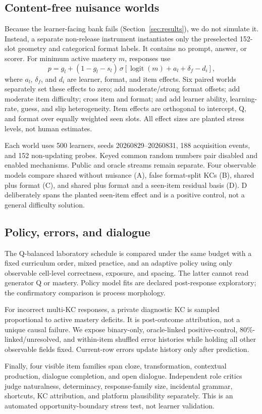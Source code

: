 \subsection{Content-free nuisance worlds}

Because the learner-facing bank fails (Section~\ref{sec:results}), we do not
simulate it.  Instead, a separate non-release instrument instantiates only the
preselected 152-slot geometry and categorical format labels.  It contains no
prompt, answer, or scorer.  For minimum active mastery $m$, responses use
\begin{equation}
p=g_l+(1-g_l-s_l)\,\sigma\!\left[
\operatorname{logit}(m)+a_l+\delta_f-d_i\right],
\end{equation}
where $a_l$, $\delta_f$, and $d_i$ are learner, format, and item effects.  Six
paired worlds separately set these effects to zero; add moderate/strong format
offsets; add moderate item difficulty; cross item and format; and add learner
ability, learning-rate, guess, and slip heterogeneity.  Item effects are
orthogonal to intercept, Q, and format over equally weighted seen slots.  All
effect sizes are planted stress levels, not human estimates.

Each world uses 500 learners, seeds 20260829--20260831, 188 acquisition events,
and 152 non-updating probes.  Keyed common random numbers pair disabled and
enabled mechanisms.  Public and oracle streams remain separate.  Four
observable models compare shared \kstar{} without nuisance (A), false
format-split KCs (B), shared \kstar{} plus format (C), and shared \kstar{} plus
format and a seen-item residual basis (D).  D deliberately spans the planted
seen-item effect and is a positive control, not a general difficulty solution.

\subsection{Policy, errors, and dialogue}

The Q-balanced laboratory schedule is compared under the same budget with a
fixed curriculum order, mixed practice, and an adaptive policy using only
observable cell-level correctness, exposure, and spacing.  The latter cannot
read generator Q or mastery.  Policy model fits are declared post-response
exploratory; the confirmatory comparison is process morphology.

For incorrect multi-KC responses, a private diagnostic KC is sampled
proportional to active mastery deficits.  It is post-outcome attribution, not a
unique causal failure.  We expose binary-only, oracle-linked positive-control,
80\%-linked/unresolved, and within-item shuffled error histories while holding
all other observable fields fixed.  Current-row errors update history only
after prediction.

Finally, four visible item families span cloze, transformation, contextual
production, dialogue completion, and open dialogue.  Independent role critics
judge naturalness, determinacy, response-family size, incidental grammar,
shortcuts, KC attribution, and platform plausibility separately.  This is an
automated opportunity-boundary stress test, not learner validation.
